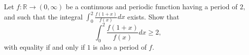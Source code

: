 Let $ f:\mathbb{R}\longrightarrow (0,\infty ) $ be a continuous and periodic function having a period of $ 2, $ and such that the integral $ \int_0^2 \frac{f(1+x)}{f(x)} dx $ exists. Show that
$$ \int_0^2 \frac{f(1+x)}{f(x)} dx\ge 2, $$with equality if and only if $ 1 $ is also a period of $ f. $